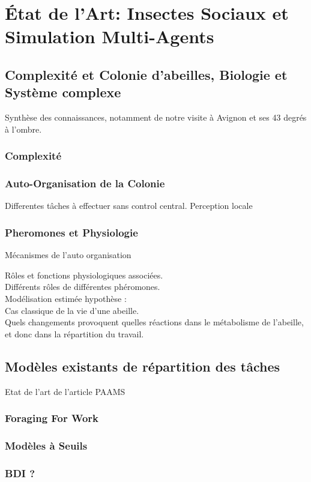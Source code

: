 \documentclass[11pt,a4paper]{report}
\begin{document}
\chapter{État de l'Art: Insectes Sociaux et Simulation Multi-Agents}
	\section{Complexité et Colonie d'abeilles, Biologie et Système complexe}
			Synthèse des connaissances, notamment de notre visite à Avignon et ses 43 degrés à l'ombre.\\
		\subsection{Complexité}
		\subsection{Auto-Organisation de la Colonie}
			Differentes tâches à effectuer sans control central. Perception locale
		\subsection{Pheromones et Physiologie}
			Mécanismes de l'auto organisation
		
			Rôles et fonctions physiologiques associées.\\
			Différents rôles de différentes phéromones.\\
			Modélisation estimée hypothèse : \\
			Cas classique de la vie d'une abeille.\\
			Quels changements provoquent quelles réactions dans le métabolisme de l'abeille, et donc dans la répartition du travail.
	\section{Modèles existants de répartition des tâches}
	Etat de l'art de l'article PAAMS
		\subsection{Foraging For Work}
		\subsection{Modèles à Seuils}
		\subsection{BDI ?}
			
\end{document}
